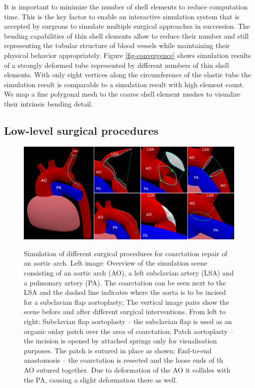 It is important to minimize the number of shell elements to reduce computation time. This is the key factor to enable an interactive simulation system that is accepted by surgeons to simulate multiple surgical approaches in succession. The bending capabilities of thin shell elements allow to reduce their number and still representing the tubular structure of blood vessels while maintaining their physical behavior appropriately. Figure \ref{fig-convergence} shows simulation results of a strongly deformed tube represented by different numbers of thin shell elements. With only eight vertices along the circumference of the elastic tube the simulation result is comparable to a simulation result with high element count. We map a fine polygonal mesh to the coarse shell element meshes to visualize their intrinsic bending detail. 

\subsection{Low-level surgical procedures}

\begin{figure}[tbh]
  \centering
  \includegraphics[width=\columnwidth]{img/surgery.png}
  \label{fig-surgery}
  \caption{Simulation of different surgical procedures for coarctation repair of an aortic arch. Left image: Overview of the simulation scene consisting of an aortic arch (AO), a left subclavian artery (LSA) and a pulmonary artery (PA). The coarctation can be seen next to the LSA and the dashed line indicates where the aorta is to be incised for a subclavian flap aortoplasty; The vertical image pairs show the scene before and after different surgical interventions. From left to right: Subclavian flap aortoplasty -- the subclavian flap is used as an organic onlay patch over the area of coarctation; Patch aortoplasty -- the incision is opened by attached springs only for visualisation purposes. The patch is sutured in place as shown; End-to-end anastomosis -- the coarctation is resected and the loose ends of th AO sutured together. Due to deformation of the AO it collides with the PA, causing a slight deformation there as well. }
\end{figure}

